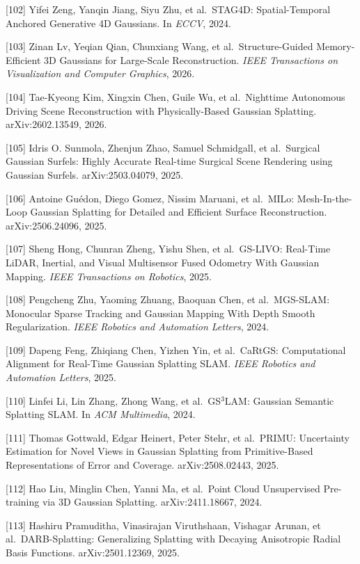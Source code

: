 {[}102{]} Yifei Zeng, Yanqin Jiang, Siyu Zhu, et al.~STAG4D: Spatial-Temporal Anchored Generative 4D Gaussians. In \emph{ECCV}, 2024.

{[}103{]} Zinan Lv, Yeqian Qian, Chunxiang Wang, et al.~Structure-Guided Memory-Efficient 3D Gaussians for Large-Scale Reconstruction. \emph{IEEE Transactions on Visualization and Computer Graphics}, 2026.

{[}104{]} Tae-Kyeong Kim, Xingxin Chen, Guile Wu, et al.~Nighttime Autonomous Driving Scene Reconstruction with Physically-Based Gaussian Splatting. arXiv:2602.13549, 2026.

{[}105{]} Idris O. Sunmola, Zhenjun Zhao, Samuel Schmidgall, et al.~Surgical Gaussian Surfels: Highly Accurate Real-time Surgical Scene Rendering using Gaussian Surfels. arXiv:2503.04079, 2025.

{[}106{]} Antoine Guédon, Diego Gomez, Nissim Maruani, et al.~MILo: Mesh-In-the-Loop Gaussian Splatting for Detailed and Efficient Surface Reconstruction. arXiv:2506.24096, 2025.

{[}107{]} Sheng Hong, Chunran Zheng, Yishu Shen, et al.~GS-LIVO: Real-Time LiDAR, Inertial, and Visual Multisensor Fused Odometry With Gaussian Mapping. \emph{IEEE Transactions on Robotics}, 2025.

{[}108{]} Pengcheng Zhu, Yaoming Zhuang, Baoquan Chen, et al.~MGS-SLAM: Monocular Sparse Tracking and Gaussian Mapping With Depth Smooth Regularization. \emph{IEEE Robotics and Automation Letters}, 2024.

{[}109{]} Dapeng Feng, Zhiqiang Chen, Yizhen Yin, et al.~CaRtGS: Computational Alignment for Real-Time Gaussian Splatting SLAM. \emph{IEEE Robotics and Automation Letters}, 2025.

{[}110{]} Linfei Li, Lin Zhang, Zhong Wang, et al.~GS\(^3\)LAM: Gaussian Semantic Splatting SLAM. In \emph{ACM Multimedia}, 2024.

{[}111{]} Thomas Gottwald, Edgar Heinert, Peter Stehr, et al.~PRIMU: Uncertainty Estimation for Novel Views in Gaussian Splatting from Primitive-Based Representations of Error and Coverage. arXiv:2508.02443, 2025.

{[}112{]} Hao Liu, Minglin Chen, Yanni Ma, et al.~Point Cloud Unsupervised Pre-training via 3D Gaussian Splatting. arXiv:2411.18667, 2024.

{[}113{]} Hashiru Pramuditha, Vinasirajan Viruthshaan, Vishagar Arunan, et al.~DARB-Splatting: Generalizing Splatting with Decaying Anisotropic Radial Basis Functions. arXiv:2501.12369, 2025.

